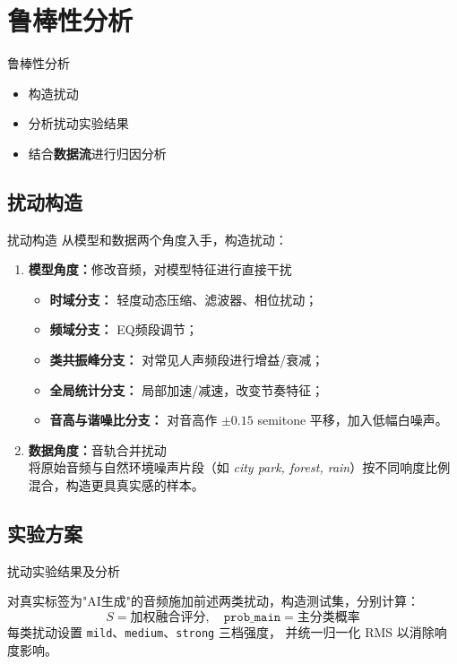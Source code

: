 \documentclass[aspectratio=169]{beamer}
\begin{document}
\section{鲁棒性分析}
\begin{frame}{鲁棒性分析}
  \begin{itemize}
    \item 构造扰动
    \item 分析扰动实验结果
    \item 结合\textbf{数据流}进行归因分析
  \end{itemize}
\end{frame}

\subsection{扰动构造}
\begin{frame}{扰动构造}
从模型和数据两个角度入手，构造扰动：
\begin{enumerate}
\item \textbf{模型角度：}修改音频，对模型特征进行直接干扰
  \begin{itemize}
    \item \textbf{时域分支：} 轻度动态压缩、滤波器、相位扰动；
    \item \textbf{频域分支：} EQ频段调节；
    \item \textbf{类共振峰分支：} 对常见人声频段进行增益/衰减；
    \item \textbf{全局统计分支：} 局部加速/减速，改变节奏特征；
    \item \textbf{音高与谐噪比分支：} 对音高作 $\pm 0.15$ semitone 平移，加入低幅白噪声。
  \end{itemize}

\item \textbf{数据角度：}音轨合并扰动\\
  将原始音频与自然环境噪声片段（如 \emph{city park, forest, rain}）按不同响度比例混合，构造更具真实感的样本。
\end{enumerate}

\end{frame}

\subsection{实验方案}
\begin{frame}{扰动实验结果及分析}

对真实标签为"AI生成"的音频施加前述两类扰动，构造测试集，分别计算：
\[
S = \text{加权融合评分}, \quad \texttt{prob\_main} = \text{主分类概率}
\]
  每类扰动设置 \texttt{mild}、\texttt{medium}、\texttt{strong} 三档强度，
  并统一归一化 RMS 以消除响度影响。
\end{frame}
\end{document}
